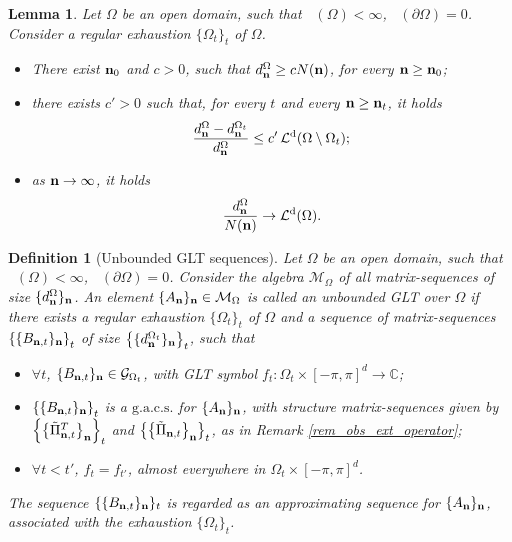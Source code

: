 \documentclass[10pt,a4paper]{amsart}
\newtheorem{lem}{Lemma}
\newtheorem{defn}{Definition}
\DeclareMathOperator{\Ld}{\mathcal{L}^d}
\begin{document}
\begin{lem}\label{dimensions}
    Let $\Omega$ be an open domain, such that $\Ld(\Omega)<\infty$, $\Ld(\partial\Omega)=0$. Consider a regular exhaustion $\{\Omega_t\}_t$ of $\Omega$.\\
    \begin{itemize}
        \item[(i)]\label{dim_item_1} There exist $\mathbf n_0$ and $c>0$, such that $d_\mathbf n^{\Omega}\geq cN(\mathbf n)$, for every $\mathbf n\geq\mathbf n_0$;\\
        \item[(ii)]\label{dim_item_2} there exists $c'>0$ such that, for every $t$ and every $\mathbf n\geq\mathbf n_t$, it holds 
        \begin{equation*}
            \frac{d_\bfn^{\Omega}-d_\bfn^{\Omega_t}}{d_\bfn^{\Omega}}\leq c'\Ld(\Omega\setminus\Omega_t);
        \end{equation*}
        \item[(iii)]\label{dim_item_3} as $\mathbf n\to\infty$, it holds
        \begin{equation*}
            \frac{d_\bfn^{\Omega}}{N(\bfn)}\to\Ld(\Omega).
        \end{equation*}
    \end{itemize}
\end{lem}

\begin{defn}[Unbounded GLT sequences]\label{def_UGLT}
    Let $\Omega$ be an open domain, such that $\Ld(\Omega)<\infty$, $\Ld(\partial\Omega)=0$.
    Consider the algebra $\mathcal{M}_{\Omega}$ of all matrix-sequences of size $\{d_\mathbf n^{\Omega}\}_\mathbf n$. An element $\{A_\mathbf n\}_\mathbf n\in\mathcal{M}_\Omega$ is called an unbounded GLT over $\Omega$ if there exists a regular exhaustion $\{\Omega_t\}_t$ of $\Omega$ and a sequence of matrix-sequences $\left\{\{B_{\mathbf n,t}\}_\mathbf n\right\}_t$ of size $\left\{\{d_\mathbf n^{\Omega_t}\}_\mathbf n\right\}_t$, such that
    \begin{itemize}
        \item[(i)] $\forall t$, $\{B_{\mathbf n,t}\}_\mathbf n\in\mathcal{G}_{\Omega_t}$, with GLT symbol $f_t:\Omega_t\times[-\pi,\pi]^d\to\mathbb{C}$;
        \item[(ii)] $\left\{\{B_{\mathbf n,t}\}_\mathbf n\right\}_t$ is a $\mathrm{g.a.c.s.}$ for $\{A_\mathbf n\}_\mathbf n$, with structure matrix-sequences given by $\left\{\left\{\tilde{\Pi}^{T}_{\mathbf n,t}\right\}_\mathbf n\right\}_t$ and $\left\{\left\{\tilde{\Pi}_{\mathbf n,t}\right\}_\mathbf n\right\}_t$, as in Remark \ref{rem_obs_ext_operator};
        \item[(iii)] $\forall t<t'$, $f_t=f_{t'}$, almost everywhere in  $\Omega_t\times[-\pi,\pi]^d$.
    \end{itemize}
    The sequence $\{\{B_{\mathbf n,t}\}_\mathbf n\}_t$ is regarded as an approximating sequence for $\{A_\mathbf n\}_\mathbf n$, associated with the exhaustion $\{\Omega_t\}_t$.
\end{defn}
\end{document}
